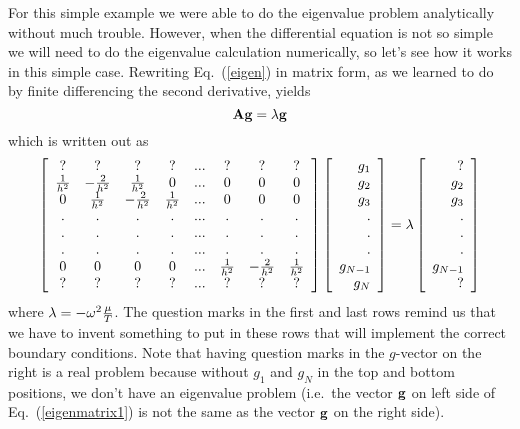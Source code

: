 For this simple example we were able to do the eigenvalue problem
analytically without much trouble. However, when the differential
equation is not so simple we will need to do the eigenvalue
calculation numerically, so let's see how it works in this simple
case. Rewriting Eq.~(\ref{eigen}) in matrix form, as we learned to do
by finite differencing the second derivative, yields
\begin{equation}
    {\bf A g} = \lambda {\bf g}
    \label{eq:eigenm}
\end{equation}
which is written out as
\begin{equation}
\left[
\begin{array}{cccccccc}
? & ? & ? & ? & ... & ? & ? & ? \\
{1 \over h^2} & -{2 \over h^2}  & {1 \over h^2} & 0 & ... & 0 & 0 & 0 \\
0 & {1 \over h^2} & -{2 \over h^2}  & {1 \over h^2} & ... & 0 & 0 & 0 \\
. & . & . & . & ... & . & . & . \\
. & . & . & . & ... & . & . & . \\
. & . & . & . & ... & . & . & . \\
0 & 0 & 0 & 0 & ... & {1 \over h^2} & -{2 \over h^2}  & {1 \over h^2} \\
? & ? & ? & ? & ... & ? & ? & ? \\
\end{array}
\right]
\left[
\begin{array}{r}
g_1 \\
g_2 \\
g_3  \\
.   \\
.   \\
.   \\
g_{N-1}  \\
g_N
\end{array}
\right]
= \lambda
\left[
\begin{array}{r}
?   \\
g_2 \\
g_3 \\
.  \\
.  \\
.  \\
g_{N-1} \\
?
\end{array}
\right]
\label{eigenmatrix1}
\end{equation}
where $\lambda = -\omega^2 {\mu \over T}$. The question marks in the
first and last rows remind us that we have to invent something to put
in these rows that will implement the correct boundary conditions.
Note that having question marks in the $g$-vector on the right is a
real problem because without $g_1$ and $g_N$ in the top and bottom
positions, we don't have an eigenvalue problem (i.e.~the vector ${\bf
g}$ on left side of Eq.~(\ref{eigenmatrix1}) is not the same as the
vector ${\bf g}$ on the right side).

